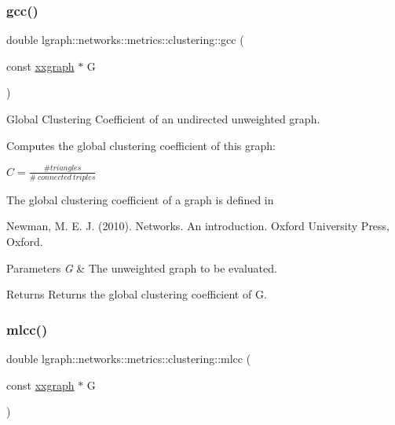 \subsubsection{\texorpdfstring{gcc()}{gcc()}}
{\footnotesize\ttfamily double lgraph\+::networks\+::metrics\+::clustering\+::gcc (\begin{DoxyParamCaption}\item[{const \hyperlink{classlgraph_1_1xxgraph}{xxgraph} $\ast$}]{G }\end{DoxyParamCaption})}



Global Clustering Coefficient of an undirected unweighted graph. 

Computes the global clustering coefficient of this graph\+:

$C = \frac{\# triangles}{\# \ connected \ triples}$

The global clustering coefficient of a graph is defined in \begin{DoxyVerb}Newman, M. E. J. (2010). Networks. An introduction. Oxford
University Press, Oxford.
\end{DoxyVerb}



\begin{DoxyParams}{Parameters}
{\em G} & The unweighted graph to be evaluated. \\
\hline
\end{DoxyParams}
\begin{DoxyReturn}{Returns}
Returns the global clustering coefficient of G. 
\end{DoxyReturn}
\mbox{\label{namespacelgraph_1_1networks_1_1metrics_1_1clustering_a489c3b47b7b69eeabacbea5248dc41e4}} 
\subsubsection{\texorpdfstring{mlcc()}{mlcc()}}
{\footnotesize\ttfamily double lgraph\+::networks\+::metrics\+::clustering\+::mlcc (\begin{DoxyParamCaption}\item[{const \hyperlink{classlgraph_1_1xxgraph}{xxgraph} $\ast$}]{G }\end{DoxyParamCaption})}



